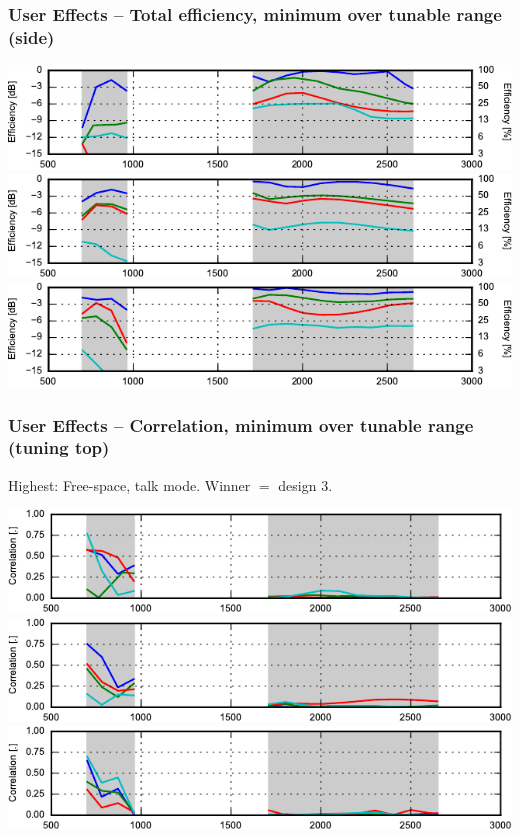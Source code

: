 \begin{frame}
    \frametitle{User Effects -- Total efficiency, minimum over tunable range (side)}
    \emptyline
    \begin{center}
        \includegraphics{img/soren/ue/design1lt/effside.pdf}\\
        \includegraphics{img/soren/ue/design2sn/effside.pdf}\\
        \includegraphics{img/soren/ue/design3hv/effside.pdf}
    \end{center}
    \legendfooter
\end{frame}

\begin{frame}
    \frametitle{User Effects -- Correlation, minimum over tunable range (tuning top)}
    Highest: Free-space, talk mode. Winner $=$ design 3.
    \begin{center}
        \includegraphics{img/soren/ue/design1lt/corrtop.pdf}\\
        \includegraphics{img/soren/ue/design2sn/corrtop.pdf}\\
        \includegraphics{img/soren/ue/design3hv/corrtop.pdf}
    \end{center}
    \legendfooter
\end{frame}

